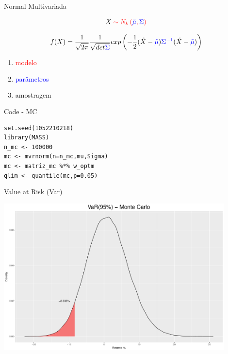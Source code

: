\documentclass{beamer}
\begin{document}
\begin{frame}{Normal Multivariada}

\begin{equation*}
X \color{red}\sim N_k\left(\color{blue}\tilde{\mu}\color{red},\color{blue}\Sigma\color{red}\right)
\end{equation*}



\begin{equation*}
f(X) = \frac{1}{\sqrt{2\pi}}\frac{1}{\sqrt{det \color{blue}\Sigma}}exp\left(-\frac{1}{2}(\tilde{X}-\color{blue}\tilde{\mu}\color{black})\color{blue}\Sigma^{-1}\color{black}(\tilde{X}-\color{blue}\tilde{\mu}\color{black})\right)
\end{equation*}


\begin{enumerate}
\item \textcolor{red}{modelo}
\item \textcolor{blue}{parâmetros}
\item amostragem
\end{enumerate}


\end{frame}


\begin{frame}[fragile]{Code - MC}


\begin{verbatim}
set.seed(1052210218)
library(MASS)
n_mc <- 100000
mc <- mvrnorm(n=n_mc,mu,Sigma)
mc <- matriz_mc %*% w_optm
qlim <- quantile(mc,p=0.05)
   \end{verbatim}
\end{frame}

\begin{frame}{Value at Risk (Var)}

\begin{center}
 \includegraphics[height=8cm,keepaspectratio]{VAR_mc.pdf}
 \end{center}
 
\end{frame}
\end{document}
